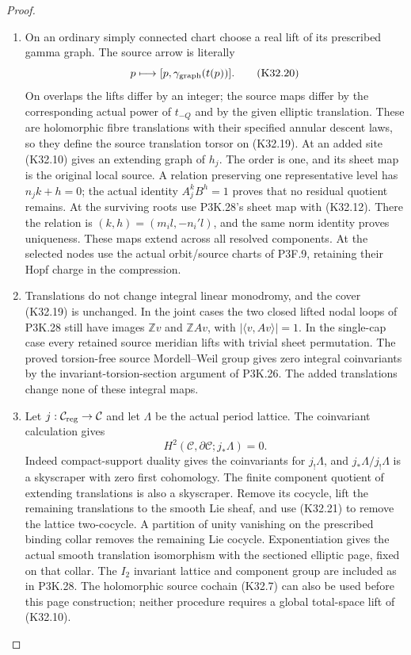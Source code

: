 \begin{proof}
\begin{enumerate}[label=\arabic*.]
\item On an ordinary simply connected chart choose a real
lift of its prescribed gamma graph. The source arrow
is literally
\[
                 p\longmapsto[p,\gamma_{\rm graph}(t(p))].
                                                               \tag{K32.20}
\]
On overlaps the lifts differ by an integer; the
source maps differ by the corresponding actual
power of $t_{-Q}$ and by the given elliptic
translation. These are holomorphic fibre translations
with their specified annular descent laws, so they
define the source translation torsor on (K32.19).
At an added site (K32.10) gives an extending graph
of $h_j$. The order is one, and its sheet map is
the original local source. A relation preserving
one representative level has $n_jk+h=0$; the actual
identity $A_j^kB^h=1$ proves that no residual quotient
remains. At the surviving roots use P3K.28's sheet
map with (K32.12). There the relation is
$(k,h)=(m_i l,-n_i' l)$, and the same norm identity
proves uniqueness. These maps extend across all
resolved components. At the selected nodes use the
actual orbit/source charts of P3F.9, retaining their
Hopf charge in the compression.

\item Translations do not change integral linear monodromy,
and the cover (K32.19) is unchanged. In the joint
cases the two closed lifted nodal loops of P3K.28
still have images $\mathbb Zv$ and $\mathbb ZAv$,
with $|\langle v,Av\rangle|=1$. In the single-cap
case every retained source meridian lifts with
trivial sheet permutation. The proved torsion-free
source Mordell--Weil group gives zero integral
coinvariants by the invariant-torsion-section
argument of P3K.26. The added translations change
none of these integral maps.

\item Let $j:\mathcal C_{\rm reg}\to\mathcal C$ and let
$\Lambda$ be the actual period lattice. The
coinvariant calculation gives
\[
       H^2(\mathcal C,\partial\mathcal C;j_*\Lambda)=0.
                                                               \tag{K32.21}
\]
Indeed compact-support duality gives the coinvariants
for $j_!\Lambda$, and $j_*\Lambda/j_!\Lambda$ is a
skyscraper with zero first cohomology. The finite
component quotient of extending translations is
also a skyscraper. Remove its cocycle, lift the
remaining translations to the smooth Lie sheaf,
and use (K32.21) to remove the lattice two-cocycle.
A partition of unity vanishing on the prescribed
binding collar removes the remaining Lie cocycle.
Exponentiation gives the actual smooth translation
isomorphism with the sectioned elliptic page, fixed
on that collar. The $I_2$ invariant lattice and
component group are included as in P3K.28.
The holomorphic source cochain (K32.7) can also be
used before this page construction; neither procedure
requires a global total-space lift of (K32.10).


\end{enumerate}
\end{proof}
